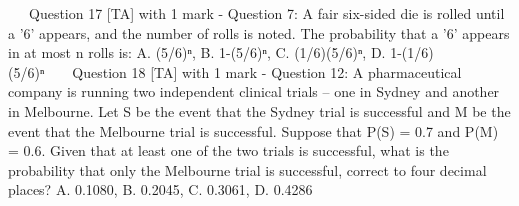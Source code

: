 \
\
\
Question 17 [TA] with 1 mark - Question 7: A fair six-sided die is rolled until a '6' appears, and the number of rolls is noted. The probability that a '6' appears in at most n rolls is: A. (5/6)ⁿ, B. 1-(5/6)ⁿ, C. (1/6)(5/6)ⁿ, D. 1-(1/6)(5/6)ⁿ\
\
\
\
Question 18 [TA] with 1 mark - Question 12: A pharmaceutical company is running two independent clinical trials – one in Sydney and another in Melbourne. Let S be the event that the Sydney trial is successful and M be the event that the Melbourne trial is successful. Suppose that P(S) = 0.7 and P(M) = 0.6. Given that at least one of the two trials is successful, what is the probability that only the Melbourne trial is successful, correct to four decimal places? A. 0.1080, B. 0.2045, C. 0.3061, D. 0.4286\
\
\
\

